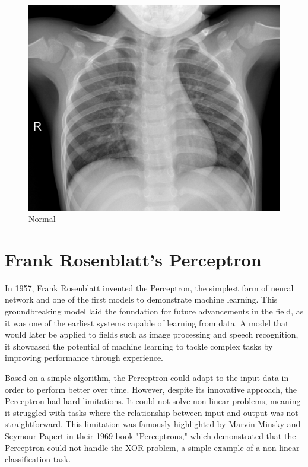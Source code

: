 \documentclass{article}
\begin{document}
\begin{figure}[!htb]
  \includegraphics[width=\linewidth]{assets/intro/scan-normal.jpeg}
  \caption*{Normal}\label{fig:scan-normal}
\endminipage
\end{figure}

\section{Frank Rosenblatt's Perceptron}

In 1957, Frank Rosenblatt invented the Perceptron, the simplest form of neural network and one of the first models to demonstrate machine learning. This groundbreaking model laid the foundation for future advancements in the field, as it was one of the earliest systems capable of learning from data. A model that would later be applied to fields such as image processing and speech recognition, it showcased the potential of machine learning to tackle complex tasks by improving performance through experience.

Based on a simple algorithm, the Perceptron could adapt to the input data in order to perform better over time. However, despite its innovative approach, the Perceptron had hard limitations. It could not solve non-linear problems, meaning it struggled with tasks where the relationship between input and output was not straightforward. This limitation was famously highlighted by Marvin Minsky and Seymour Papert in their 1969 book "Perceptrons," which demonstrated that the Perceptron could not handle the XOR problem, a simple example of a non-linear classification task.
\end{document}
